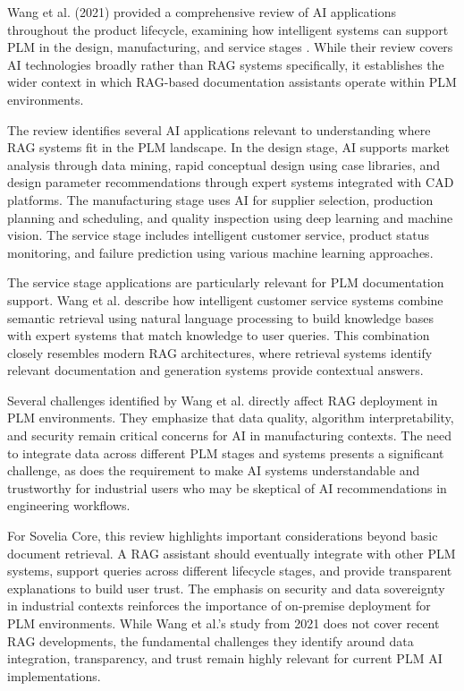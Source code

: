 Wang et al. (2021) provided a comprehensive review of AI applications throughout the product lifecycle, examining how intelligent systems can support PLM in the design, manufacturing, and service stages \parencite{wang_artificial_2021}. While their review covers AI technologies broadly rather than RAG systems specifically, it establishes the wider context in which RAG-based documentation assistants operate within PLM environments.

The review identifies several AI applications relevant to understanding where RAG systems fit in the PLM landscape. In the design stage, AI supports market analysis through data mining, rapid conceptual design using case libraries, and design parameter recommendations through expert systems integrated with CAD platforms. The manufacturing stage uses AI for supplier selection, production planning and scheduling, and quality inspection using deep learning and machine vision. The service stage includes intelligent customer service, product status monitoring, and failure prediction using various machine learning approaches.

The service stage applications are particularly relevant for PLM documentation support. Wang et al. describe how intelligent customer service systems combine semantic retrieval using natural language processing to build knowledge bases with expert systems that match knowledge to user queries. This combination closely resembles modern RAG architectures, where retrieval systems identify relevant documentation and generation systems provide contextual answers.

Several challenges identified by Wang et al. directly affect RAG deployment in PLM environments. They emphasize that data quality, algorithm interpretability, and security remain critical concerns for AI in manufacturing contexts. The need to integrate data across different PLM stages and systems presents a significant challenge, as does the requirement to make AI systems understandable and trustworthy for industrial users who may be skeptical of AI recommendations in engineering workflows.

For Sovelia Core, this review highlights important considerations beyond basic document retrieval. A RAG assistant should eventually integrate with other PLM systems, support queries across different lifecycle stages, and provide transparent explanations to build user trust. The emphasis on security and data sovereignty in industrial contexts reinforces the importance of on-premise deployment for PLM environments. While Wang et al.'s study from 2021 does not cover recent RAG developments, the fundamental challenges they identify around data integration, transparency, and trust remain highly relevant for current PLM AI implementations.

